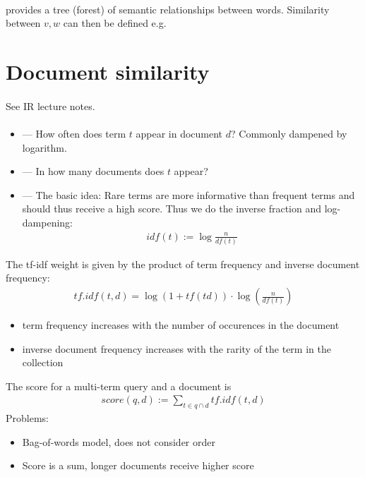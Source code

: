 \documentclass[10pt,twocolumn]{article}
\begin{document}
\paragraph{} provides a tree (forest) of semantic relationships
between words. Similarity between $v,w$ can then be defined e.g. \todo


\section{Document similarity}

\paragraph{} See IR lecture notes.

\paragraph{} \begin{itemize}
\item {} --- How often does term $t$ appear in
  document $d$? Commonly dampened by logarithm.
\item {} --- In how many documents does $t$ appear?
\item {}  ---
  The basic idea: Rare terms are more informative
  than frequent terms and should thus receive a high score.  Thus we do the
  inverse fraction and log-dampening:
  \begin{align*}
    \mathit{idf}(t) := \log \frac{n}{\mathit{df}(t)}
  \end{align*}
\end{itemize}
The tf-idf weight is given by the product of term frequency and inverse document
frequency:
\begin{align*}
  \mathit{tf.idf}(t,d) = \log(1 + \mathit{tf}(td)) \cdot \log \left( \frac{n}{\mathit{df}(t)} \right)
\end{align*}
\begin{itemize}
\item term frequency increases with the number of occurences in the document
\item inverse document frequency increases with the rarity of the term in the collection
\end{itemize}

The score for a multi-term query and a document is
\begin{align*}
  \mathit{score}(q,d) := \sum_{t \in q \cap d} \mathit{tf.idf}(t,d)
\end{align*}
Problems:
\begin{itemize}
\item Bag-of-words model, does not consider order
\item Score is a sum, longer documents receive higher score
\end{itemize}
\end{document}
